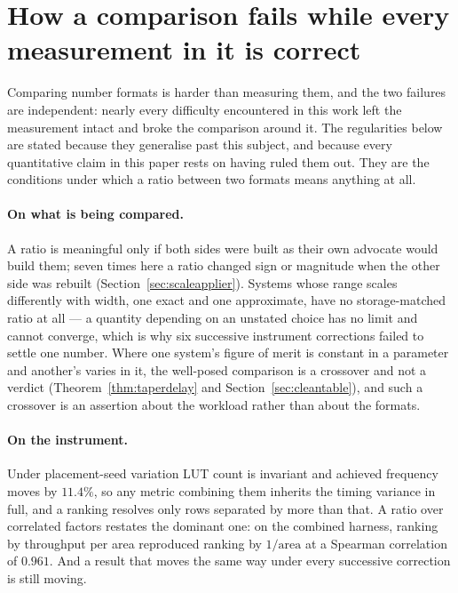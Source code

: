 \section{How a comparison fails while every measurement in it is correct}
\label{sec:selfcheck}

Comparing number formats is harder than measuring them, and the two failures
are independent: nearly every difficulty encountered in this work left the
measurement intact and broke the comparison around it. The regularities below are
stated because they generalise past this subject, and because every quantitative
claim in this paper rests on having ruled them out. They are the conditions under
which a ratio between two formats means anything at all.

\paragraph{On what is being compared.} A ratio is meaningful only if both sides
were built as their own advocate would build them; seven times here a ratio
changed sign or magnitude when the other side was rebuilt
(Section~\ref{sec:scaleapplier}). Systems whose range scales differently with
width, one exact and one approximate, have no storage-matched ratio at all --- a
quantity depending on an unstated choice has no limit and cannot converge, which
is why six successive instrument corrections failed to settle one number. Where
one system's figure of merit is constant in a parameter and another's varies in
it, the well-posed comparison is a crossover and not a verdict
(Theorem~\ref{thm:taperdelay} and Section~\ref{sec:cleantable}), and such a
crossover is an assertion about the workload rather than about the formats.

\paragraph{On the instrument.} Under placement-seed variation LUT count is
invariant and achieved frequency moves by $11.4\%$, so any metric combining them
inherits the timing variance in full, and a ranking resolves only rows separated
by more than that. A ratio over correlated factors restates the dominant one: on
the combined harness, ranking by throughput per area reproduced ranking by
$1/\text{area}$ at a Spearman correlation of $0.961$. And a result that moves the
same way under every successive correction is still moving.

